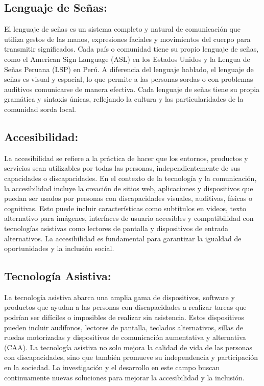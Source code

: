 \subsection{Lenguaje de Señas: }
El lenguaje de señas es un sistema completo y natural de comunicación que utiliza gestos de las manos, expresiones faciales y movimientos del cuerpo para transmitir significados. Cada país o comunidad tiene su propio lenguaje de señas, como el American Sign Language (ASL) en los Estados Unidos y la Lengua de Señas Peruana (LSP) en Perú. A diferencia del lenguaje hablado, el lenguaje de señas es visual y espacial, lo que permite a las personas sordas o con problemas auditivos comunicarse de manera efectiva. Cada lenguaje de señas tiene su propia gramática y sintaxis únicas, reflejando la cultura y las particularidades de la comunidad sorda local.
\subsection{Accesibilidad: }
La accesibilidad se refiere a la práctica de hacer que los entornos, productos y servicios sean utilizables por todas las personas, independientemente de sus capacidades o discapacidades. En el contexto de la tecnología y la comunicación, la accesibilidad incluye la creación de sitios web, aplicaciones y dispositivos que puedan ser usados por personas con discapacidades visuales, auditivas, físicas o cognitivas. Esto puede incluir características como subtítulos en videos, texto alternativo para imágenes, interfaces de usuario accesibles y compatibilidad con tecnologías asistivas como lectores de pantalla y dispositivos de entrada alternativos. La accesibilidad es fundamental para garantizar la igualdad de oportunidades y la inclusión social.
\subsection{Tecnología Asistiva: }
La tecnología asistiva abarca una amplia gama de dispositivos, software y productos que ayudan a las personas con discapacidades a realizar tareas que podrían ser difíciles o imposibles de realizar sin asistencia. Estos dispositivos pueden incluir audífonos, lectores de pantalla, teclados alternativos, sillas de ruedas motorizadas y dispositivos de comunicación aumentativa y alternativa (CAA). La tecnología asistiva no solo mejora la calidad de vida de las personas con discapacidades, sino que también promueve su independencia y participación en la sociedad. La investigación y el desarrollo en este campo buscan continuamente nuevas soluciones para mejorar la accesibilidad y la inclusión.
